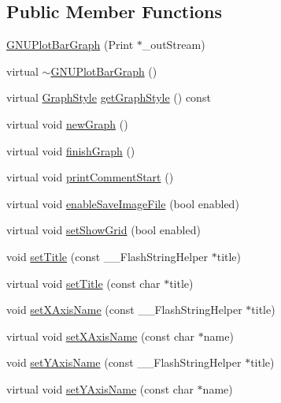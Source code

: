 \subsection*{Public Member Functions}
\begin{DoxyCompactItemize}
\item 
\hyperlink{class_g_n_u_plot_bar_graph_ad1e03b9c837e0f6cf9572fcd188ab587}{G\+N\+U\+Plot\+Bar\+Graph} (Print $\ast$\+\_\+out\+Stream)
\item 
virtual \hyperlink{class_g_n_u_plot_bar_graph_a8f589415abcfadb6338a90c2e914be70}{$\sim$\+G\+N\+U\+Plot\+Bar\+Graph} ()
\item 
virtual \hyperlink{_serial_graph_8h_adc73bce6b7e6c4ecf37dde452d6a385e}{Graph\+Style} \hyperlink{class_g_n_u_plot_bar_graph_a6b2cde2832fcb246361d8ebddbe7a228}{get\+Graph\+Style} () const 
\item 
virtual void \hyperlink{class_g_n_u_plot_base_a4d4da234cfdeb99ec3228ef7b2df8a50}{new\+Graph} ()
\item 
virtual void \hyperlink{class_g_n_u_plot_base_aa4b0574c35fbee4dc5f25451eaf956dd}{finish\+Graph} ()
\item 
virtual void \hyperlink{class_g_n_u_plot_base_a219601bd41203477ae73a18d18dd7443}{print\+Comment\+Start} ()
\item 
virtual void \hyperlink{class_serial_graph_a28b020807c52c113685aa6a31f836c52}{enable\+Save\+Image\+File} (bool enabled)
\item 
virtual void \hyperlink{class_serial_graph_abf488e449d6d786bc01478793d0094ad}{set\+Show\+Grid} (bool enabled)
\item 
void \hyperlink{class_serial_graph_a4db09b008589914b71b2ee8b1873db7a}{set\+Title} (const \+\_\+\+\_\+\+Flash\+String\+Helper $\ast$title)
\item 
virtual void \hyperlink{class_serial_graph_ad726b2c84cec50c2d4bfe769e62a9bcd}{set\+Title} (const char $\ast$title)
\item 
void \hyperlink{class_serial_graph_afdb759a860c41de2fc4cfe78519b9fc0}{set\+X\+Axis\+Name} (const \+\_\+\+\_\+\+Flash\+String\+Helper $\ast$title)
\item 
virtual void \hyperlink{class_serial_graph_ac7f30036f5006091af51204a4d9efaf2}{set\+X\+Axis\+Name} (const char $\ast$name)
\item 
void \hyperlink{class_serial_graph_abfc46c15cf8e1b4362a7f51cb11c7bdb}{set\+Y\+Axis\+Name} (const \+\_\+\+\_\+\+Flash\+String\+Helper $\ast$title)
\item 
virtual void \hyperlink{class_serial_graph_ab0c675c8682959261f79dcf37b04148c}{set\+Y\+Axis\+Name} (const char $\ast$name)

\end{DoxyCompactItemize}
